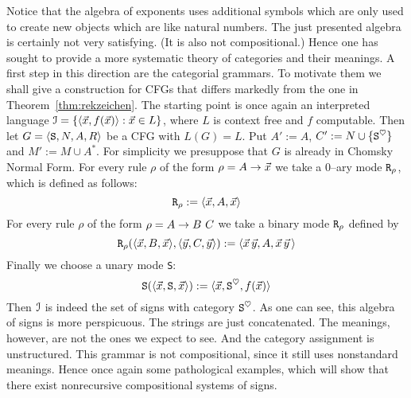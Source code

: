 Notice that the algebra of exponents uses additional symbols
which are only used to create new objects which are like
natural numbers. The just presented algebra is certainly not
very satisfying. (It is also not compositional.) Hence one has
sought to provide a more systematic theory of categories and their
meanings. A first step in this direction are the categorial
grammars. To motivate them we shall give a construction for
CFGs that differs markedly from the one in
Theorem~\ref{thm:rekzeichen}. The starting point is once again
an interpreted language $\mathcal{I} = \{\langle \vec{x}, f(\vec{x})\rangle :
\vec{x} \in L\}$, where $L$ is context free and $f$
computable. Then let $G = \langle \mbox{\tt S}, N, A, R\rangle$ be
a CFG with $L(G) = L$. Put
$A' := A$, $C' := N \cup \{\mbox{\tt S}^{\heartsuit}\}$
and $M' := M \cup A^{\ast}$. For simplicity we presuppose 
that $G$ is already in Chomsky Normal Form.
For every rule $\rho$ of the form $\rho = A \rightarrow \vec{x}$
we take a 0--ary mode $\mbox{\tt R}_{\rho}$, which is defined
as follows:
\begin{equation}
\mbox{\tt R}_{\rho} := \langle \vec{x}, A, \vec{x}\rangle 
\end{equation}
For every rule $\rho$ of the form $\rho = A \rightarrow B\ C$ we take
a binary mode $\mbox{\tt R}_{\rho}$ defined by
\begin{equation}
\mbox{\tt R}_{\rho}(\langle \vec{x}, B, \vec{x}\rangle,
    \langle \vec{y}, C, \vec{y}\rangle) :=
    \langle \vec{x}\, \vec{y}, A, \vec{x}\, \vec{y}\,\rangle 
\end{equation}
Finally we choose a unary mode {\tt S}:
\begin{equation}
\mbox{\tt S}(\langle \vec{x}, \mbox{\tt S}, \vec{x}\rangle) :=
    \langle \vec{x}, \mbox{\tt S}^{\heartsuit}, f(\vec{x})\rangle 
\end{equation}
Then $\mathcal{I}$ is indeed the set of signs with category
$\mbox{\tt S}^{\heartsuit}$. As one can see, this algebra of signs
is more perspicuous. The strings are just concatenated. The meanings,
however, are not the ones we expect to see. And the category assignment
is unstructured. This grammar is not compositional, since it still
uses nonstandard meanings. Hence once again some pathological examples, 
which will show that there exist nonrecursive compositional systems of
signs.

